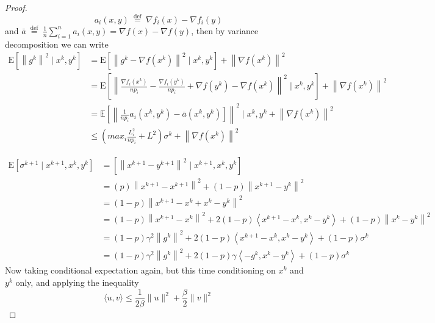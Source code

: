 \documentclass[8pt,a4paper]{article}
\newcommand{\E}{\mathbb{E}}
\begin{document}
	\begin{proof}
		$$
		a_{i}(x, y) \stackrel{\text { def }}{=} \nabla f_{i}(x)-\nabla f_{i}(y)
		$$
		and $\bar{a} \stackrel{\text { def }}{=} \frac{1}{n} \sum_{i=1}^{n} a_{i}(x, y)=\nabla f(x)-\nabla f(y)$, then by variance decomposition we can write
		$$
		\begin{aligned}
			\mathrm{E}\left[\left\|g^{k}\right\|^{2} \mid x^{k}, y^{k}\right] &=\mathrm{E}\left[\left\|g^{k}-\nabla f\left(x^{k}\right)\right\|^{2} \mid x^{k}, y^{k}\right]+\left\|\nabla f\left(x^{k}\right)\right\|^{2} \\
			&= \mathrm{E}\left[\left\|\frac{\nabla f_i(x^k)}{np_i}-\frac{\nabla f_i(y^k)}{np_i}+\nabla f\left(y^{k}\right)-\nabla f\left(x^{k}\right)\right\|^{2} \mid x^{k}, y^{k}\right]+\left\|\nabla f\left(x^{k}\right)\right\|^{2} \\
			&=\E\left[\left\|\frac{1}{np_i} a_i(x^k,y^k)-\bar{a}\left(x^{k}, y^{k}\right)\right]\right\|^{2} \mid x^{k}, y^{k}+\left\|\nabla f\left(x^{k}\right)\right\|^{2}\\
			&\leq (max_i\frac{L_i^2}{np_i}+L^2)\sigma^k+\left\|\nabla f\left(x^{k}\right)\right\|^{2}
		\end{aligned}
		$$
		
		\begin{equation}
			\begin{aligned}
				\mathrm{E}\left[\sigma^{k+1} \mid x^{k+1}, x^{k}, y^{k}\right] &=\left[\left\|x^{k+1}-y^{k+1}\right\|^{2} \mid x^{k+1}, x^{k}, y^{k}\right] \\
				& \stackrel{}{=} 
			(p)\left\|x^{k+1}-x^{k+1}\right\|^{2}+(1-p)\left\|x^{k+1}-y^{k}\right\|^{2} \\
				&=(1-p)\left\|x^{k+1}-x^{k}+x^{k}-y^{k}\right\|^{2} \\
				&=(1-p)\left\|x^{k+1}-x^{k}\right\|^{2}+2(1-p)\left\langle x^{k+1}-x^{k}, x^{k}-y^{k}\right\rangle+(1-p)\left\|x^{k}-y^{k}\right\|^{2} \\
				&=(1-p) \gamma^{2}\left\|g^{k}\right\|^{2}+2(1-p)\left\langle x^{k+1}-x^{k}, x^{k}-y^{k}\right\rangle+(1-p) \sigma^{k} \\
				&=(1-p) \gamma^{2}\left\|g^{k}\right\|^{2}+2(1-p) \gamma\left\langle-g^{k}, x^{k}-y^{k}\right\rangle+(1-p) \sigma^{k}
			\end{aligned}
		\end{equation}
	Now taking conditional expectation again, but this time conditioning on $x^{k}$ and $y^{k}$ only, and applying the inequality
	$$
	\langle u, v\rangle \leq \frac{1}{2 \beta}\|u\|^{2}+\frac{\beta}{2}\|v\|^{2}
	$$
	

\end{proof}
\end{document}
